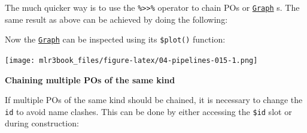 \documentclass[]{article}
\newenvironment{Shaded}{\begin{snugshade}}{\end{snugshade}}
\newcommand{\CommentTok}[1]{\textcolor[rgb]{0.56,0.35,0.01}{\textit{#1}}}
\newcommand{\DataTypeTok}[1]{\textcolor[rgb]{0.13,0.29,0.53}{#1}}
\newcommand{\KeywordTok}[1]{\textcolor[rgb]{0.13,0.29,0.53}{\textbf{#1}}}
\newcommand{\NormalTok}[1]{#1}
\newcommand{\OperatorTok}[1]{\textcolor[rgb]{0.81,0.36,0.00}{\textbf{#1}}}
\newcommand{\OtherTok}[1]{\textcolor[rgb]{0.56,0.35,0.01}{#1}}
\newcommand{\StringTok}[1]{\textcolor[rgb]{0.31,0.60,0.02}{#1}}
\renewenvironment{Shaded} {\begin{snugshade}\small} {\end{snugshade}}
\begin{document}
The much quicker way is to use the \texttt{\%\textgreater{}\textgreater{}\%} operator to chain POs or \href{https://mlr3pipelines.mlr-org.com/reference/Graph.html}{\texttt{Graph}} s.
The same result as above can be achieved by doing the following:

\begin{Shaded}
\end{Shaded}

Now the \href{https://mlr3pipelines.mlr-org.com/reference/Graph.html}{\texttt{Graph}} can be inspected using its \texttt{\$plot()} function:

\begin{Shaded}
\end{Shaded}

\texttt{[image: mlr3book\_files/figure-latex/04-pipelines-015-1.png]}

\textbf{Chaining multiple POs of the same kind}

If multiple POs of the same kind should be chained, it is necessary to change the \texttt{id} to avoid name clashes.
This can be done by either accessing the \texttt{\$id} slot or during construction:

\begin{Shaded}
\end{Shaded}

\begin{Shaded}
\end{Shaded}
\end{document}
